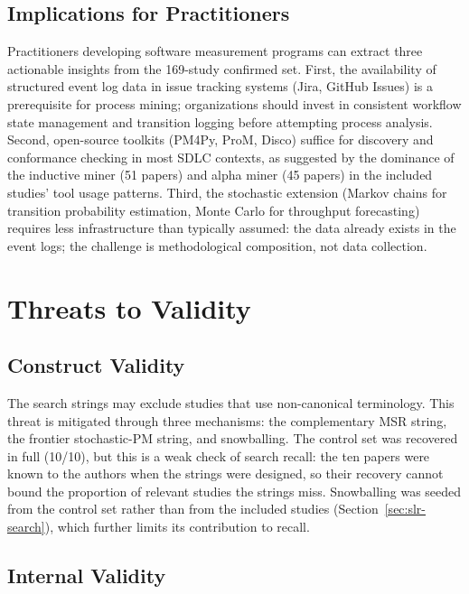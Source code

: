 \subsection{Implications for Practitioners}
\label{sec:slr-practitioners}

Practitioners developing software measurement programs can extract three
actionable insights from the 169-study confirmed set. First, the availability
of structured event log data in issue tracking systems (Jira, GitHub Issues)
is a prerequisite for process mining; organizations should invest in
consistent workflow state management and transition logging before attempting
process analysis. Second, open-source toolkits (PM4Py, ProM, Disco) suffice
for discovery and conformance checking in most SDLC contexts, as suggested by
the dominance of the inductive miner (51 papers) and alpha miner (45 papers)
in the included studies' tool usage patterns. Third, the stochastic extension
(Markov chains for transition probability estimation, Monte Carlo for
throughput forecasting) requires less infrastructure than typically assumed:
the data already exists in the event logs; the challenge is methodological
composition, not data collection.


\section{Threats to Validity}
\label{sec:slr-threats}

\subsection{Construct Validity}

The search strings may exclude studies that use non-canonical terminology.
This threat is mitigated through three mechanisms: the complementary MSR
string, the frontier stochastic-PM string, and snowballing. The control set
was recovered in full (10/10), but this is a weak check of search recall: the
ten papers were known to the authors when the strings were designed, so their
recovery cannot bound the proportion of relevant studies the strings miss.
Snowballing was seeded from the control set rather than from the included
studies (Section~\ref{sec:slr-search}), which further limits its contribution
to recall.

\subsection{Internal Validity}


